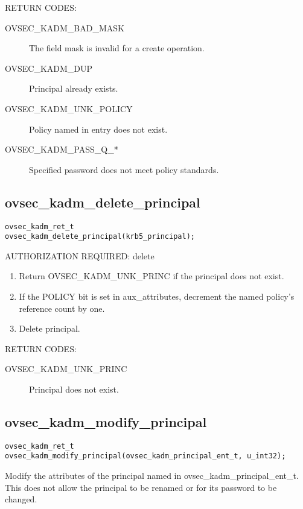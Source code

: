 RETURN CODES:

\begin{description}
\item[OVSEC_KADM_BAD_MASK] The field mask is invalid for a create
operation.
\item[OVSEC_KADM_DUP] Principal already exists.
\item[OVSEC_KADM_UNK_POLICY] Policy named in entry does not exist.
\item[OVSEC_KADM_PASS_Q_*] Specified password does not meet policy
standards.
\end{description}

\subsection{ovsec_kadm_delete_principal}

\begin{verbatim}
ovsec_kadm_ret_t
ovsec_kadm_delete_principal(krb5_principal);
\end{verbatim}

AUTHORIZATION REQUIRED: delete 

\begin{enumerate}
\item Return OVSEC_KADM_UNK_PRINC if the principal does not exist.
\item If the POLICY bit is set in aux_attributes, decrement the named
policy's reference count by one.
\item Delete principal.
\end{enumerate}

RETURN CODES: 

\begin{description}
\item[OVSEC_KADM_UNK_PRINC] Principal does not exist.
\end{description}

\subsection{ovsec_kadm_modify_principal}

\begin{verbatim}
ovsec_kadm_ret_t
ovsec_kadm_modify_principal(ovsec_kadm_principal_ent_t, u_int32);
\end{verbatim}

Modify the attributes of the principal named in
ovsec_kadm_principal_ent_t. This does not allow the principal to be
renamed or for its password to be changed.

